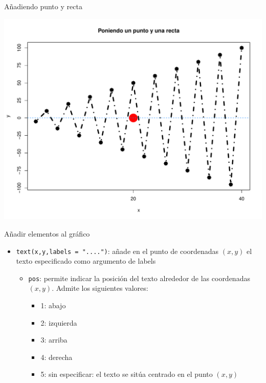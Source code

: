 \documentclass[
  ignorenonframetext,
  aspectratio=169]{beamer}
\providecommand{\tightlist}{%
  \setlength{\itemsep}{0pt}\setlength{\parskip}{0pt}}
\begin{document}
\begin{frame}{Añadiendo punto y recta}
\protect\hypertarget{auxf1adiendo-punto-y-recta-1}{}
\begin{center}\includegraphics[width=0.65\linewidth]{Hora2_files/figure-beamer/unnamed-chunk-14-1} \end{center}
\end{frame}

\begin{frame}[fragile]{Añadir elementos al gráfico}
\protect\hypertarget{auxf1adir-elementos-al-gruxe1fico-1}{}
\begin{itemize}
\tightlist
\item
  \texttt{text(x,y,labels\ =\ "....")}: añade en el punto de coordenadas
  \((x,y)\) el texto especificado como argumento de labels

  \begin{itemize}
  \tightlist
  \item
    \texttt{pos}: permite indicar la posición del texto alrededor de las
    coordenadas \((x,y)\). Admite los siguientes valores:

    \begin{itemize}
    \tightlist
    \item
      1: abajo
    \item
      2: izquierda
    \item
      3: arriba
    \item
      4: derecha
    \item
      5: sin especificar: el texto se sitúa centrado en el punto
      \((x,y)\)
    \end{itemize}
  \end{itemize}
\end{itemize}
\end{frame}
\end{document}
